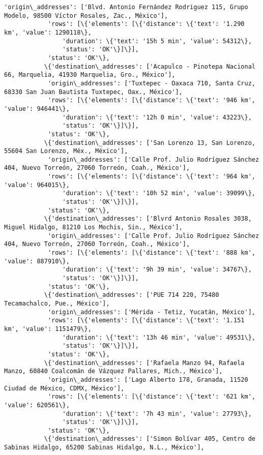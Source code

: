 \documentclass[11pt]{article}
\begin{document}
\begin{Verbatim}[commandchars=\\\{\}]
            'origin\_addresses': ['Blvd. Antonio Fernández Rodriguez 115, Grupo Modelo, 98500 Víctor Rosales, Zac., México'],
            'rows': [\{'elements': [\{'distance': \{'text': '1.290 km', 'value': 1290118\},
                'duration': \{'text': '15h 5 min', 'value': 54312\},
                'status': 'OK'\}]\}],
            'status': 'OK'\},
           \{'destination\_addresses': ['Acapulco - Pinotepa Nacional 66, Marquelia, 41930 Marquelia, Gro., México'],
            'origin\_addresses': ['Tuxtepec - Oaxaca 710, Santa Cruz, 68330 San Juan Bautista Tuxtepec, Oax., México'],
            'rows': [\{'elements': [\{'distance': \{'text': '946 km', 'value': 946441\},
                'duration': \{'text': '12h 0 min', 'value': 43223\},
                'status': 'OK'\}]\}],
            'status': 'OK'\},
           \{'destination\_addresses': ['San Lorenzo 13, San Lorenzo, 55604 San Lorenzo, Méx., México'],
            'origin\_addresses': ['Calle Prof. Julio Rodríguez Sánchez 404, Nuevo Torreón, 27060 Torreón, Coah., México'],
            'rows': [\{'elements': [\{'distance': \{'text': '964 km', 'value': 964015\},
                'duration': \{'text': '10h 52 min', 'value': 39099\},
                'status': 'OK'\}]\}],
            'status': 'OK'\},
           \{'destination\_addresses': ['Blvrd Antonio Rosales 3038, Miguel Hidalgo, 81210 Los Mochis, Sin., México'],
            'origin\_addresses': ['Calle Prof. Julio Rodríguez Sánchez 404, Nuevo Torreón, 27060 Torreón, Coah., México'],
            'rows': [\{'elements': [\{'distance': \{'text': '888 km', 'value': 887910\},
                'duration': \{'text': '9h 39 min', 'value': 34767\},
                'status': 'OK'\}]\}],
            'status': 'OK'\},
           \{'destination\_addresses': ['PUE 714 220, 75480 Tecamachalco, Pue., México'],
            'origin\_addresses': ['Mérida - Tetiz, Yucatán, México'],
            'rows': [\{'elements': [\{'distance': \{'text': '1.151 km', 'value': 1151479\},
                'duration': \{'text': '13h 46 min', 'value': 49531\},
                'status': 'OK'\}]\}],
            'status': 'OK'\},
           \{'destination\_addresses': ['Rafaela Manzo 94, Rafaela Manzo, 60840 Coalcomán de Vázquez Pallares, Mich., México'],
            'origin\_addresses': ['Lago Alberto 178, Granada, 11520 Ciudad de México, CDMX, México'],
            'rows': [\{'elements': [\{'distance': \{'text': '621 km', 'value': 620561\},
                'duration': \{'text': '7h 43 min', 'value': 27793\},
                'status': 'OK'\}]\}],
            'status': 'OK'\},
           \{'destination\_addresses': ['Simon Bolívar 405, Centro de Sabinas Hidalgo, 65200 Sabinas Hidalgo, N.L., México'],

\end{Verbatim}
\end{document}
